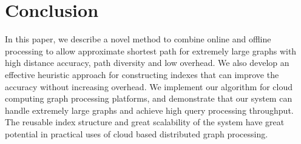\section{Conclusion}
\label{conclusion}

In this paper, we describe a novel method to combine online and offline processing to allow approximate shortest path for extremely large graphs with high distance accuracy, path diversity and low overhead. 
We also develop an effective heuristic approach for constructing indexes that can improve the accuracy without increasing overhead. We implement our algorithm for cloud computing graph processing platforms, and demonstrate that our system can handle extremely large graphs and achieve high query processing throughput. The reusable index structure and great scalability of the system have great potential in practical uses of cloud based distributed graph processing.
